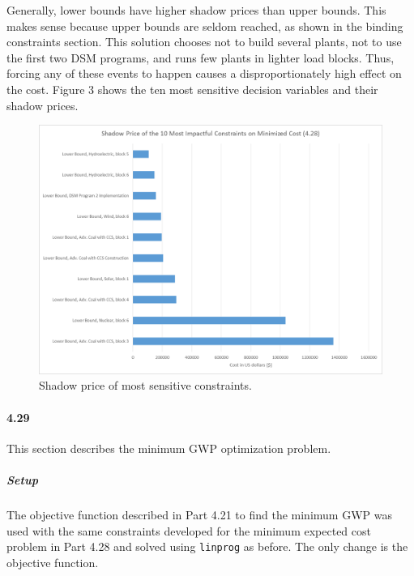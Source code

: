 \documentclass{article}
\begin{document}
		Generally, lower bounds have higher shadow prices than upper bounds. This makes sense because upper bounds are seldom reached, as shown in the binding constraints section. This solution chooses not to build several plants, not to use the first two DSM programs, and runs few plants in lighter load blocks. Thus, forcing any of these events to happen causes a disproportionately high effect on the cost. Figure 3 shows the ten most sensitive decision variables and their shadow prices.
		
	\begin{figure}
		\includegraphics[width=\textwidth]{428_3_Mincostsens}
		\caption{Shadow price of most sensitive constraints.}
	\end{figure}


\paragraph{4.29}
	This section describes the minimum GWP optimization problem.
	
	\subparagraph{Setup}
	The objective function described in Part 4.21 to find the minimum GWP was used with the same constraints developed for the minimum expected cost problem in Part 4.28 and solved using \texttt{linprog} as before. The only change is the objective function.
	
\end{document}
